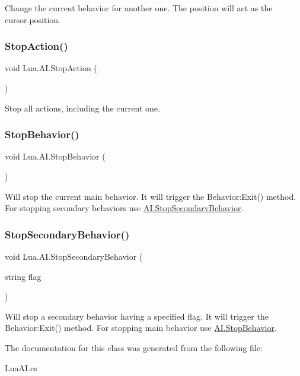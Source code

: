 Change the current behavior for another one. The position will act as the cursor.\+position. 

\mbox{\label{class_lua_1_1_a_i_ab29a427f16c210c0839771b2552b21ce}} 
\subsubsection{\texorpdfstring{StopAction()}{StopAction()}}
{\footnotesize\ttfamily void Lua.\+A\+I.\+Stop\+Action (\begin{DoxyParamCaption}{ }\end{DoxyParamCaption})}



Stop all actions, including the current one. 

\mbox{\label{class_lua_1_1_a_i_aa30ed6fc0195cd828d3f5971b80ae053}} 
\subsubsection{\texorpdfstring{StopBehavior()}{StopBehavior()}}
{\footnotesize\ttfamily void Lua.\+A\+I.\+Stop\+Behavior (\begin{DoxyParamCaption}{ }\end{DoxyParamCaption})}



Will stop the current main behavior. It will trigger the Behavior\+:Exit() method. For stopping secondary behaviors use \mbox{\hyperlink{class_lua_1_1_a_i_a8c9a883b10e07fe120ff68d75391fe2b}{A\+I.\+Stop\+Secondary\+Behavior}}. 

\mbox{\label{class_lua_1_1_a_i_a8c9a883b10e07fe120ff68d75391fe2b}} 
\subsubsection{\texorpdfstring{StopSecondaryBehavior()}{StopSecondaryBehavior()}}
{\footnotesize\ttfamily void Lua.\+A\+I.\+Stop\+Secondary\+Behavior (\begin{DoxyParamCaption}\item[{string}]{flag }\end{DoxyParamCaption})}



Will stop a secondary behavior having a specified flag. It will trigger the Behavior\+:Exit() method. For stopping main behavior use \mbox{\hyperlink{class_lua_1_1_a_i_aa30ed6fc0195cd828d3f5971b80ae053}{A\+I.\+Stop\+Behavior}}. 



The documentation for this class was generated from the following file\+:\begin{DoxyCompactItemize}
\item 
Lua\+A\+I.\+cs\end{DoxyCompactItemize}
